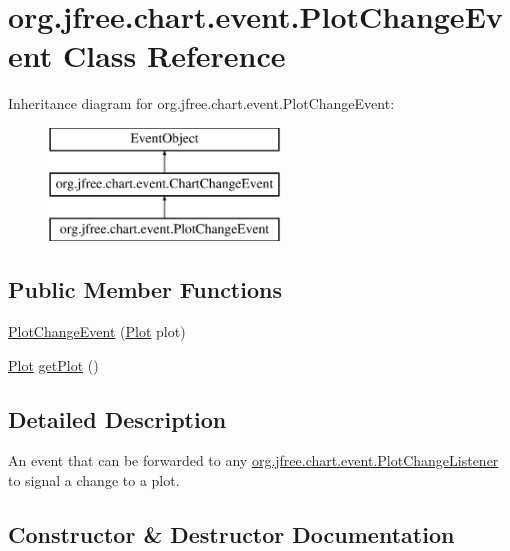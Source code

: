 \hypertarget{classorg_1_1jfree_1_1chart_1_1event_1_1_plot_change_event}{}\section{org.\+jfree.\+chart.\+event.\+Plot\+Change\+Event Class Reference}
\label{classorg_1_1jfree_1_1chart_1_1event_1_1_plot_change_event}
Inheritance diagram for org.\+jfree.\+chart.\+event.\+Plot\+Change\+Event\+:\begin{figure}[H]
\begin{center}
\leavevmode
\includegraphics[height=3.000000cm]{classorg_1_1jfree_1_1chart_1_1event_1_1_plot_change_event}
\end{center}
\end{figure}
\subsection*{Public Member Functions}
\begin{DoxyCompactItemize}
\item 
\mbox{\hyperlink{classorg_1_1jfree_1_1chart_1_1event_1_1_plot_change_event_a1adafce2eb562fe6aee1f15dc85489a6}{Plot\+Change\+Event}} (\mbox{\hyperlink{classorg_1_1jfree_1_1chart_1_1plot_1_1_plot}{Plot}} plot)
\item 
\mbox{\hyperlink{classorg_1_1jfree_1_1chart_1_1plot_1_1_plot}{Plot}} \mbox{\hyperlink{classorg_1_1jfree_1_1chart_1_1event_1_1_plot_change_event_a267aa078202c9ecc28706e0837b1063a}{get\+Plot}} ()
\end{DoxyCompactItemize}


\subsection{Detailed Description}
An event that can be forwarded to any \mbox{\hyperlink{interfaceorg_1_1jfree_1_1chart_1_1event_1_1_plot_change_listener}{org.\+jfree.\+chart.\+event.\+Plot\+Change\+Listener}} to signal a change to a plot. 

\subsection{Constructor \& Destructor Documentation}
\mbox{\label{classorg_1_1jfree_1_1chart_1_1event_1_1_plot_change_event_a1adafce2eb562fe6aee1f15dc85489a6}} 
